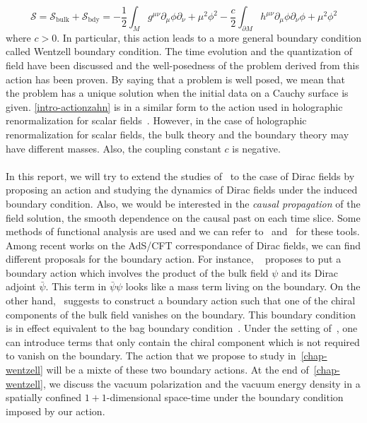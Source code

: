 \begin{equation}\label{intro-actionzahn}
\mathcal{S} = \mathcal{S}_{\mathrm{bulk}} + \mathcal{S}_{\mathrm{bdy}} = 
-\frac 1 2 \int_M g^{\mu\nu} \partial_\mu \phi \partial_{\nu} + 
\mu^2\phi^2 - \frac c 2 \int_{\partial M}h^{\mu\nu}\partial_\mu\phi\partial_\nu\phi + \mu^2\phi^2
\end{equation}
where $c>0$.
In particular, this action leads to  a more general boundary condition called Wentzell boundary condition.
The time evolution and the quantization of field have been discussed and the well-posedness of the problem derived from this action has been proven.
By saying that a problem is well posed, we mean that the problem has a unique solution when the initial data on a Cauchy surface is given.
\cref{intro-actionzahn} is in a similar form to the action used in holographic renormalization for scalar fields~\cite{Skenderis2002}. 
However, in the case of holographic renormalization for scalar fields, the bulk theory and the boundary theory may have different masses.
Also, the coupling constant $c$ is negative. \\\\
%
In this report, we will try to extend the studies of~\cite{Zahn2016} to the case of Dirac fields by proposing an action and studying the dynamics of Dirac fields under the induced boundary condition.
Also, we would be interested in the \textit{causal propagation} of the field solution, \ie the smooth dependence on the causal past on each time slice.
Some methods of functional analysis are used and we can refer to~\cite{Reed1981} and~\cite{Reed1975} for these tools. 
%
Among recent works on the AdS/CFT correspondance of Dirac fields, we can find different proposals for the boundary action.
For instance, 
~\cite{Henningson1998} proposes to put a boundary action which involves the product of the bulk field $\psi$ and its Dirac adjoint $\bar{\psi}$. 
This term in $\bar{\psi}\psi$ looks like a mass term living on the boundary.
On the other hand,~\cite{Contino2005} suggests to construct a boundary action such that one of the chiral components of the bulk field vanishes on the boundary.
This boundary condition is in effect equivalent to the bag boundary condition~\cite{Chodos1974}.
Under the setting of~\cite{Contino2005}, one can introduce terms that only contain the chiral component which is not required to vanish on the boundary.
The action that we propose to study in~\cref{chap-wentzell} will be a mixte of these two boundary actions.
At the end of~\cref{chap-wentzell}, we discuss the vacuum polarization and the vacuum energy density in a spatially confined $1+1$-dimensional space-time under the boundary condition imposed by our action.
